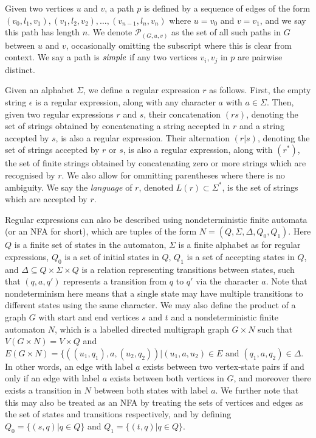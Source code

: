 \documentclass{article}
\begin{document}
Given two vertices $u$ and $v$, a path $p$ is defined by a sequence of edges of the form $(v_0, l_1, v_1), (v_1, l_2, v_2), \dots, (v_{n-1}, l_n, v_n)$ where $u = v_0$ and $v = v_1$, and we say this path has length $n$. We denote $\mathcal{P}_{(G, u ,v)}$ as the set of all such paths in $G$ between $u$ and $v$, occasionally omitting the subscript where this is clear from context.  We say a path is $\emph{simple}$ if any two vertices $v_i, v_j$ in $p$ are pairwise distinct.

Given an alphabet $\Sigma$, we define a regular expression $r$ as follows. First, the empty string $\epsilon$ is a regular expression, along with any character $a$ with $a \in \Sigma$. Then, given two regular expressions $r$ and $s$, their concatenation $(rs)$, denoting the set of strings obtained by concatenating a string accepted in $r$ and a string accepted by $s$, is also a regular expression. Their alternation $(r | s)$, denoting the set of strings accepted by $r$ or $s$, is also a regular expression, along with $(r^*)$, the set of finite strings obtained by concatenating zero or more strings which are recognised by $r$. We also allow for ommitting parentheses where there is no ambiguity. We say the \emph{language} of $r$, denoted $L(r) \subset \Sigma^*$, is the set of strings which are accepted by $r$.

Regular expressions can also be described using nondeterministic finite automata (or an NFA for short), which are tuples of the form $N = (Q, \Sigma, \Delta, Q_0, Q_1)$. Here $Q$ is a finite set of states in the automaton, $\Sigma$ is a finite alphabet as for regular expressions, $Q_0$ is a set of initial states in $Q$, $Q_1$ is a set of accepting states in $Q$, and $\Delta \subseteq Q \times \Sigma \times Q$ is a relation representing transitions between states, such that $(q, a, q')$ represents a transition from $q$ to $q'$ via the character $a$. Note that nondeterminism here means that a single state may have multiple transitions to different states using the same character. We may also define the product of a graph $G$ with start and end vertices $s$ and $t$ and a nondeterministic finite automaton $N$, which is a labelled directed multigraph graph $G \times N$ such that $V(G \times N) = V \times Q$ and $E(G \times N) = \{((u_1, q_1), a, (u_2,q_2)) | (u_1, a, u_2) \in E \text{ and } (q_1, a, q_2) \in \Delta$. In other words, an edge with label $a$ exists between two vertex-state pairs if and only if an edge with label $a$ exists between both vertices in $G$, and moreover there exists a transition in $N$ between both states with label $a$. We further note that this may also be treated as an NFA by treating the sets of vertices and edges as the set of states and transitions respectively, and by defining $Q_0 = \{(s, q) | q \in Q\}$ and $Q_1 = \{(t, q) | q \in Q\}$.
\end{document}
